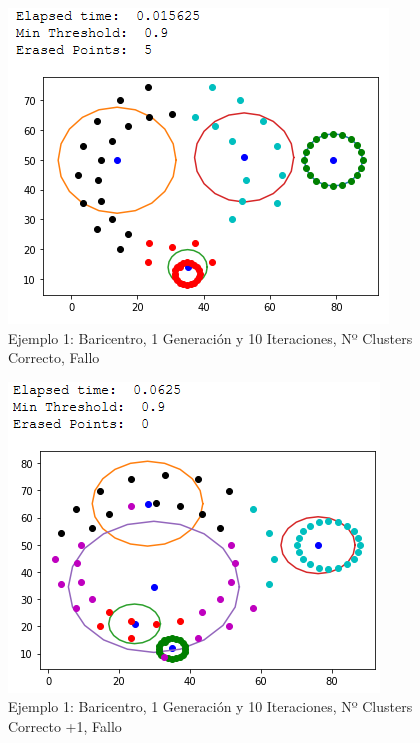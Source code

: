 \documentclass[conference,a4paper]{IEEEtran}
\begin{document}
\begin{figure}[H]
\centering
\includegraphics[scale=0.65]{Experimentacion/Ejemplo1/ej1_b_1_10_cc}
\caption{Ejemplo 1: Baricentro, 1 Generación y 10 Iteraciones,  Nº Clusters Correcto, Fallo\\}
\end{figure}

\begin{figure}[H]
\centering
\includegraphics[scale=0.65]{Experimentacion/Ejemplo1/ej1_b_1_10_mc}
\caption{Ejemplo 1: Baricentro, 1 Generación y 10 Iteraciones,  Nº Clusters Correcto +1, Fallo\\}
\end{figure}
\end{document}
